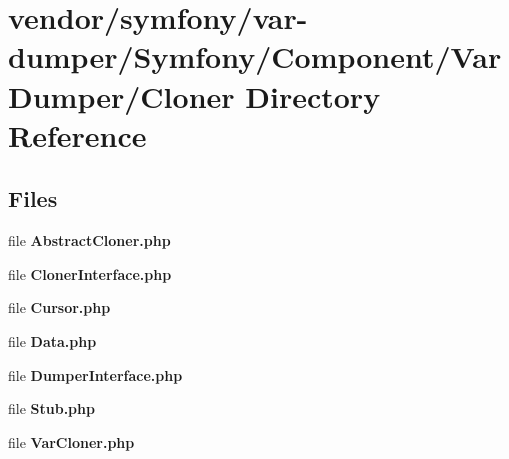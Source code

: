 \section{vendor/symfony/var-\/dumper/\+Symfony/\+Component/\+Var\+Dumper/\+Cloner Directory Reference}
\label{dir_fc9bab672feebbb7501c2e7af171b3e4}
\subsection*{Files}
\begin{DoxyCompactItemize}
\item 
file {\bf Abstract\+Cloner.\+php}
\item 
file {\bf Cloner\+Interface.\+php}
\item 
file {\bf Cursor.\+php}
\item 
file {\bf Data.\+php}
\item 
file {\bf Dumper\+Interface.\+php}
\item 
file {\bf Stub.\+php}
\item 
file {\bf Var\+Cloner.\+php}
\end{DoxyCompactItemize}
